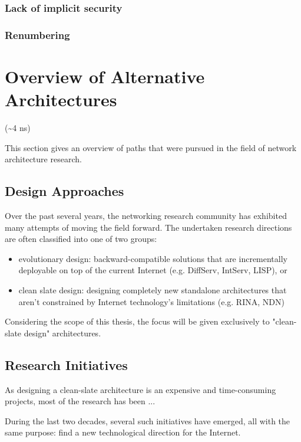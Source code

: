         \subsection{Lack of implicit security}

        \subsection{Renumbering}

\chapter{Overview of Alternative Architectures}
    (\textasciitilde4 ns)

    This section gives an overview of paths that were pursued in the field of network architecture research.

    \section{Design Approaches}

        Over the past several years, the networking research community has exhibited many attempts of moving the field forward. The undertaken research directions are often classified into one of two groups:

        \begin{itemize}
            \item evolutionary design: backward-compatible solutions that are incrementally deployable on top of the current Internet (e.g. DiffServ, IntServ, LISP), or
            \item clean slate design: designing completely new standalone architectures that aren't constrained by Internet technology's limitations (e.g. RINA, NDN)
        \end{itemize}

        Considering the scope of this thesis, the focus will be given exclusively to "clean-slate design" architectures.

    \section{Research Initiatives}

        As designing a clean-slate architecture is an expensive and time-consuming projects, most of the research has been ...

        During the last two decades, several such initiatives have emerged, all with the same purpose: find a new technological direction for the Internet.

